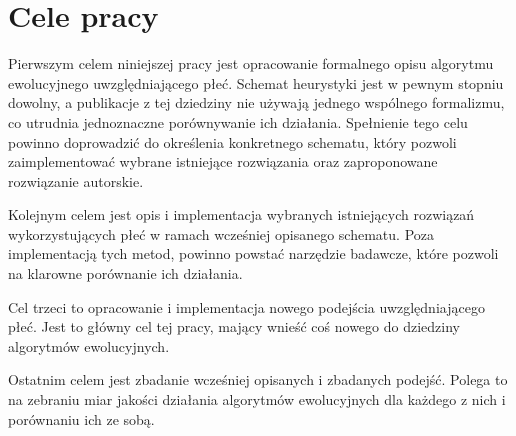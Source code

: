 \documentclass[./FM_mgr.tex]{subfiles}
\begin{document}
\section*{Cele pracy}

Pierwszym celem niniejszej pracy jest opracowanie formalnego opisu algorytmu ewolucyjnego uwzględniającego płeć.
Schemat heurystyki jest w pewnym stopniu dowolny, a publikacje z tej dziedziny nie używają jednego wspólnego formalizmu, co utrudnia jednoznaczne porównywanie ich działania.
Spełnienie tego celu powinno doprowadzić do określenia konkretnego schematu, który pozwoli zaimplementować wybrane istniejące rozwiązania oraz zaproponowane rozwiązanie autorskie.

Kolejnym celem jest opis i implementacja wybranych istniejących rozwiązań wykorzystujących płeć w ramach wcześniej opisanego schematu.
Poza implementacją tych metod, powinno powstać narzędzie badawcze, które pozwoli na klarowne porównanie ich działania.

Cel trzeci to opracowanie i implementacja nowego podejścia uwzględniającego płeć.
Jest to główny cel tej pracy, mający wnieść coś nowego do dziedziny algorytmów ewolucyjnych.

Ostatnim celem jest zbadanie wcześniej opisanych i zbadanych podejść.
Polega to na zebraniu miar jakości działania algorytmów ewolucyjnych dla każdego z nich i porównaniu ich ze sobą.
\end{document}
